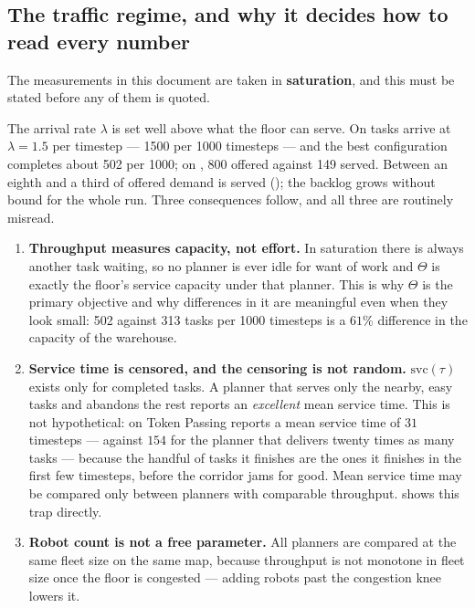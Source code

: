 \subsection{The traffic regime, and why it decides how to read every number}
\label{sec:regime}

The measurements in this document are taken in \textbf{saturation}, and this
must be stated before any of them is quoted.

The arrival rate $\lambda$ is set well above what the floor can serve. On
 tasks arrive at $\lambda = 1.5$ per timestep ---
1500 per 1000 timesteps --- and the best configuration completes about 502 per
1000; on , 800 offered against 149 served. Between
an eighth and a third of offered demand is served (); the
backlog grows without bound for the whole run. Three consequences follow, and all three are
routinely misread.

\begin{enumerate}
\item \textbf{Throughput measures capacity, not effort.} In saturation there
is always another task waiting, so no planner is ever idle for want of work and
$\Theta$ is exactly the floor's service capacity under that planner. This is
why $\Theta$ is the primary objective and why differences in it are meaningful
even when they look small: 502 against 313 tasks per 1000 timesteps is a
$61\%$ difference in the capacity of the warehouse.

\item \textbf{Service time is censored, and the censoring is not random.}
$\mathrm{svc}(\tau)$ exists only for completed tasks. A planner that serves
only the nearby, easy tasks and abandons the rest reports an \emph{excellent}
mean service time. This is not hypothetical: on
 Token Passing reports a mean service time of
$31$ timesteps --- against $154$ for the planner that delivers twenty times as
many tasks --- because the handful of tasks it finishes are the ones it
finishes in the first few timesteps, before the corridor jams for good. Mean
service time may be compared only between planners with comparable throughput.
 shows this trap directly.

\item \textbf{Robot count is not a free parameter.} All planners are compared
at the same fleet size on the same map, because throughput is not monotone in
fleet size once the floor is congested --- adding robots past the congestion
knee lowers it.
\end{enumerate}

